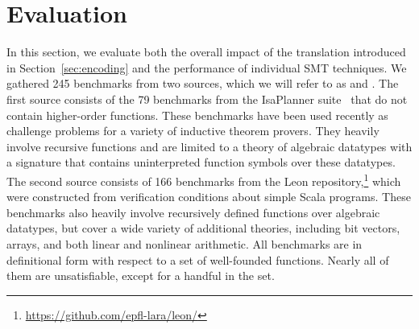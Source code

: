 
\section{Evaluation}
\label{sec:evaluation}

{
In this section, we evaluate both the overall impact of the translation
introduced in Section~\ref{sec:encoding} and the performance of individual SMT
techniques.
%
We gathered 245 benchmarks from two sources, which we will refer to as
\isa and \leon. The first source consists of the 79
benchmarks from the IsaPlanner
suite~\cite{DBLP:conf/itp/JohanssonDB10} that do not contain higher-order
functions. These benchmarks have been used recently as challenge problems for a
variety of inductive theorem provers. They heavily involve
recursive functions and are limited to a theory of algebraic datatypes
with a signature that contains uninterpreted function symbols over these datatypes. 
The second source consists of 166
benchmarks from the Leon repository,\footnote{%
\url{https://github.com/epfl-lara/leon/}} which were constructed from
verification conditions about simple Scala programs. These benchmarks also
heavily involve recursively defined functions over algebraic datatypes, 
but cover a wide variety of additional theories, including bit vectors, arrays, and
both linear and nonlinear arithmetic. All benchmarks are in definitional form
with respect to a set of well-founded functions.
%
Nearly all of them are unsatisfiable, except for a
handful in the \leon set.

}

